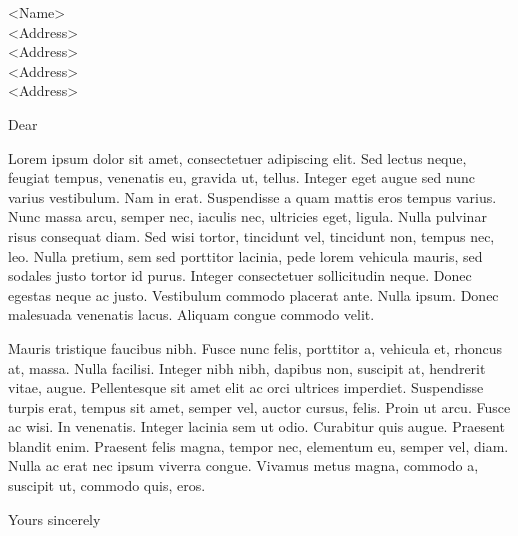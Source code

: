 \documentclass[a4paper]{uoe-letter}
\begin{document}
\begin{letter}{
    <Name>\\
    <Address>\\
    <Address>\\
    <Address>\\
    <Address>
  }

  \opening{Dear}
  Lorem ipsum dolor sit amet, consectetuer adipiscing elit. Sed lectus neque, feugiat tempus, venenatis eu, gravida ut, tellus. Integer eget augue sed nunc varius vestibulum. Nam in erat. Suspendisse a quam mattis eros tempus varius. Nunc massa arcu, semper nec, iaculis nec, ultricies eget, ligula. Nulla pulvinar risus consequat diam. Sed wisi tortor, tincidunt vel, tincidunt non, tempus nec, leo. Nulla pretium, sem sed porttitor lacinia, pede lorem vehicula mauris, sed sodales justo tortor id purus. Integer consectetuer sollicitudin neque. Donec egestas neque ac justo. Vestibulum commodo placerat ante. Nulla ipsum. Donec malesuada venenatis lacus. Aliquam congue commodo velit. 

Mauris tristique faucibus nibh. Fusce nunc felis, porttitor a, vehicula et, rhoncus at, massa. Nulla facilisi. Integer nibh nibh, dapibus non, suscipit at, hendrerit vitae, augue. Pellentesque sit amet elit ac orci ultrices imperdiet. Suspendisse turpis erat, tempus sit amet, semper vel, auctor cursus, felis. Proin ut arcu. Fusce ac wisi. In venenatis. Integer lacinia sem ut odio. Curabitur quis augue. Praesent blandit enim. Praesent felis magna, tempor nec, elementum eu, semper vel, diam. Nulla ac erat nec ipsum viverra congue. Vivamus metus magna, commodo a, suscipit ut, commodo quis, eros. 

  \closing{Yours sincerely}
\end{letter}
\end{document}
